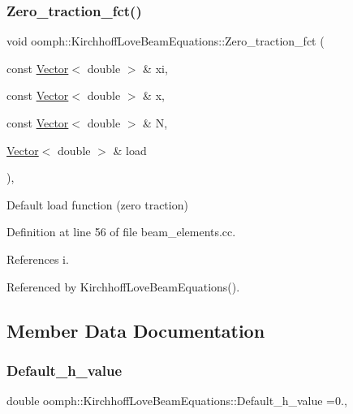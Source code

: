 \subsubsection{\texorpdfstring{Zero\+\_\+traction\+\_\+fct()}{Zero\_traction\_fct()}}
{\footnotesize\ttfamily void oomph\+::\+Kirchhoff\+Love\+Beam\+Equations\+::\+Zero\+\_\+traction\+\_\+fct (\begin{DoxyParamCaption}\item[{const \hyperlink{classoomph_1_1Vector}{Vector}$<$ double $>$ \&}]{xi,  }\item[{const \hyperlink{classoomph_1_1Vector}{Vector}$<$ double $>$ \&}]{x,  }\item[{const \hyperlink{classoomph_1_1Vector}{Vector}$<$ double $>$ \&}]{N,  }\item[{\hyperlink{classoomph_1_1Vector}{Vector}$<$ double $>$ \&}]{load }\end{DoxyParamCaption})\hspace{0.3cm}{\ttfamily [static]}, {\ttfamily [protected]}}



Default load function (zero traction) 



Definition at line 56 of file beam\+\_\+elements.\+cc.



References i.



Referenced by Kirchhoff\+Love\+Beam\+Equations().



\subsection{Member Data Documentation}
\mbox{\label{classoomph_1_1KirchhoffLoveBeamEquations_a8761f159953be81594eee6432c94790d}} 
\subsubsection{\texorpdfstring{Default\+\_\+h\+\_\+value}{Default\_h\_value}}
{\footnotesize\ttfamily double oomph\+::\+Kirchhoff\+Love\+Beam\+Equations\+::\+Default\+\_\+h\+\_\+value =0.\hspace{0.3cm}{\ttfamily [static]}, {\ttfamily [private]}}



